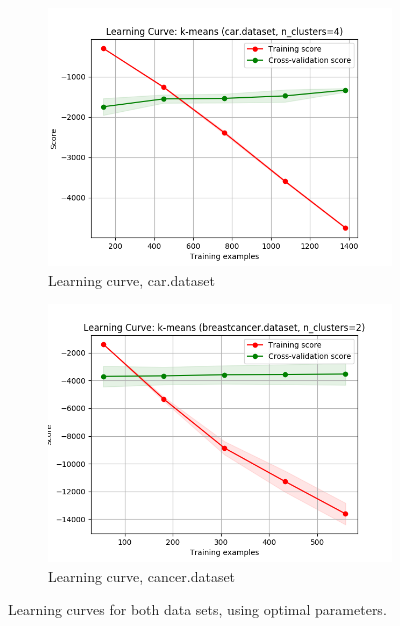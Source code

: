 \documentclass{article}
\begin{document}
        \begin{figure}[htb]
        \centering

          \begin{subfigure}{0.4\textwidth}
            \includegraphics[width=\linewidth]{out/kmeans/car-learning.png}
            \caption{Learning curve, car.dataset}
            \label{fig:kmeans-learning-car}
          \end{subfigure}\hfil
          \begin{subfigure}{0.4\textwidth}
            \includegraphics[width=\linewidth]{out/kmeans/cancer-learning.png}
            \caption{Learning curve, cancer.dataset}
            \label{fig:kmeans-learning-cancer}
          \end{subfigure}

        \caption{Learning curves for both data sets, using optimal parameters.}
        \label{fig:kmeans-learning}
        \end{figure}
\end{document}
